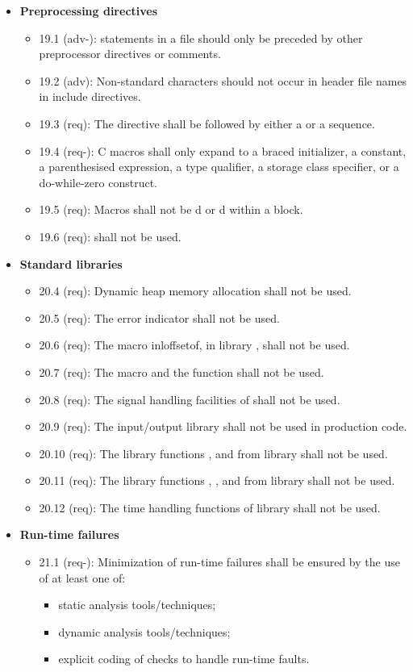 \begin{itemize}
\begin{itemize}
\end{itemize}
\item \textbf{Preprocessing directives}
\begin{itemize}
\item 19.1 (adv-):  statements in a file should only be preceded by other preprocessor directives or comments.
\item 19.2 (adv): Non-standard characters should not occur in header file names in include directives.
\item 19.3 (req): The  directive shall be followed by either a  or a  sequence.
\item 19.4 (req-): C macros shall only expand to a braced initializer, a constant, a parenthesised expression, a type qualifier, a storage class specifier, or a do-while-zero construct.
\item 19.5 (req): Macros shall not be d or d within a block.
\item 19.6 (req):  shall not be used.
\end{itemize}
\item \textbf{Standard libraries}
\begin{itemize}
\item 20.4 (req): Dynamic heap memory allocation shall not be used.
\item 20.5 (req): The error indicator  shall not be used.
\item 20.6 (req): The macro inl{offsetof}, in library , shall not be used.
\item 20.7 (req): The  macro and the  function shall not be used.
\item 20.8 (req): The signal handling facilities of  shall not be used.
\item 20.9 (req): The input/output library  shall not be used in production code.
\item 20.10 (req): The library functions ,  and  from library  shall not be used.
\item 20.11 (req): The library functions , ,  and  from library  shall not be used.
\item 20.12 (req): The time handling functions of library  shall not be used.
\end{itemize}
\item \textbf{Run-time failures}
\begin{itemize}
\item 21.1 (req-): Minimization of run-time failures shall be ensured by the use of at least one of: 
\begin{itemize}
\item static analysis tools/techniques;
\item dynamic analysis tools/techniques;
\item explicit coding of checks to handle run-time faults.
\end{itemize}
\end{itemize}
\end{itemize}

